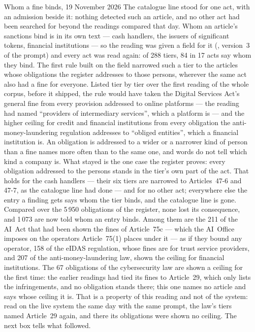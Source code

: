 \begin{lessonbox}{Whom a fine binds, 19 November 2026}
The catalogue line stood for one act, with an admission beside it: nothing detected such an
article, and no other act had been searched for beyond the readings compared that day. Whom
an article's sanctions bind is in its own text --- cash handlers, the issuers of significant
tokens, financial institutions --- so the reading was given a field for it (,
version~3 of the prompt) and every act was read again: of 288 tiers, 84 in 17 acts say whom
they bind. The first rule built on the field narrowed such a tier to the articles whose
obligations the register addresses to those persons, wherever the same act also had a fine
for everyone. Listed tier by tier over the first reading of the whole corpus, before it
shipped, the rule would have taken the Digital Services Act's general fine from every
provision addressed to online platforms --- the reading had named \enquote{providers of
intermediary services}, which a platform is --- and the higher ceiling for credit and
financial institutions from every obligation the anti-money-laundering regulation addresses
to \enquote{obliged entities}, which a financial institution is. An obligation is addressed
to a wider or a narrower kind of person than a fine names more often than to the same one,
and words do not tell which kind a company is. What stayed is the one case the register
proves: every obligation addressed to the persons stands in the tier's own part of the act.
That holds for the cash handlers --- their six tiers are narrowed to Articles~47-6 and 47-7,
as the catalogue line had done --- and for no other act; everywhere else the entry a finding
gets says whom the tier binds, and the catalogue line is gone. Compared over the 5\,950
obligations of the register, none lost its consequence, and 1\,073 are now told whom an
entry binds. Among them are the 211 of the AI~Act that had been shown the fines of
Article~75c --- which the AI~Office imposes on the operators Article~75(1) places under it
--- as if they bound any operator, 158 of the eIDAS regulation, whose fines are for trust
service providers, and 207 of the anti-money-laundering law, shown the ceiling for financial
institutions. The 67 obligations of the cybersecurity law are shown a ceiling for the first
time: the earlier readings had tied its fines to Article~29, which only lists the
infringements, and no obligation stands there; this one names no article and says whose
ceiling it is. That is a property of this reading and not of the system: read on the live
system the same day with the same prompt, the law's tiers named Article~29 again, and there
its obligations were shown no ceiling. The next box tells what followed.
\end{lessonbox}

